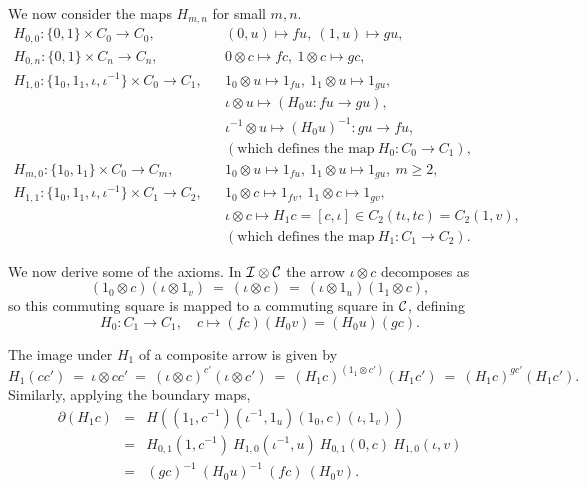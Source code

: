We now consider the maps $H_{m,n}$ for small $m,n$. 
\begin{eqnarray*}
H_{0,0} : \{0,1\}\times C_0 \to C_0,  
  &&  (0,u) \mapsto fu,~ (1,u) \mapsto gu, \\
H_{0,n} : \{0,1\}\times C_n \to C_n,  
  &&  0 \otimes c \mapsto fc,~ 1 \otimes c \mapsto gc, \\
H_{1,0} : \{1_0,1_1,\iota,\iota^{-1}\}\times C_0 \to C_1,  
  &&  1_0 \otimes u \mapsto 1_{fu},~ 1_1 \otimes u \mapsto 1_{gu}, \\
  &&  \iota \otimes u \mapsto (H_0 u : fu \to gu), \\
  &&  \iota^{-1} \otimes u \mapsto (H_0 u)^{-1} : gu \to fu, \\
  &&  (\text{which defines the map}~ H_0 : C_0 \to C_1), \\
H_{m,0} : \{1_0,1_1\}\times C_0 \to C_m,  
  &&  1_0 \otimes u \mapsto 1_{fu},~ 1_1 \otimes u \mapsto 1_{gu},~ 
        m \geqslant 2, \\
H_{1,1} : \{1_0,1_1,\iota,\iota^{-1}\}\times C_1 \to C_2,  
  &&  1_0 \otimes c \mapsto 1_{fv},~ 1_1 \otimes c \mapsto 1_{gv}, \\
  &&  \iota \otimes c \mapsto H_1 c = [c,\iota] 
        \in C_2(t\iota, tc) = C_2(1,v), \\
  &&  (\text{which defines the map}~ H_1 : C_1 \to C_2).
\end{eqnarray*}

We now derive some of the axioms. 
In $\mathcal{I}\otimes\mathcal{C}$ the arrow $\iota \otimes c$ decomposes as
$$
(1_0 \otimes c)(\iota \otimes 1_v) 
~=~ (\iota \otimes c) ~=~ (\iota \otimes 1_u)(1_1 \otimes c), 
$$
so this commuting square is mapped to a commuting square in $\mathcal{C}$, defining 
$$
H_0 : C_1 \to C_1,\quad  c \mapsto (fc)(H_0 v) = (H_0 u)(gc). 
$$

\noindent
The image under $H_1$ of a composite arrow is given by 
$$
H_1(cc') ~=~ \iota \otimes cc' 
           ~=~ (\iota \otimes c)^{c'}(\iota \otimes c') 
           ~=~ (H_1 c)^{(1_1 \otimes c')}(H_1 c') 
           ~=~ (H_1 c)^{gc'}(H_1 c').
$$
Similarly, applying the boundary maps, 
\begin{eqnarray*}
\partial(H_1 c) 
  &=&  H\left((1_1,c^{-1})(\iota^{-1},1_u)(1_0,c)(\iota,1_v)\right) \\
  &=&  H_{0,1}(1,c^{-1})\ H_{1,0}(\iota^{-1},u)\ 
       H_{0,1}(0,c)\      H_{1,0}(\iota,v) \\ 
  &=&  (gc)^{-1}\ (H_0 u)^{-1}\ (fc)\ (H_0 v).
\end{eqnarray*}

